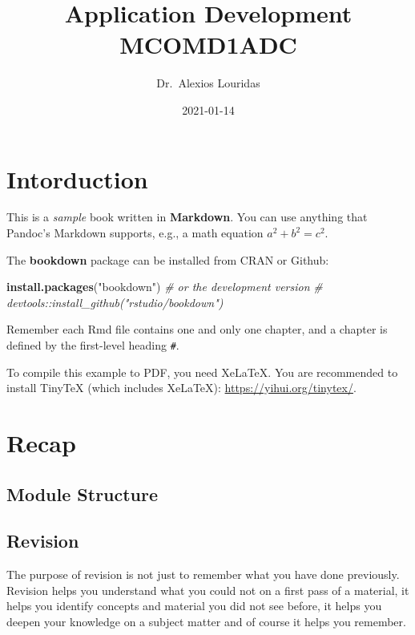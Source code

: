 \documentclass[
]{book}
\title{Application Development MCOMD1ADC}
\author{Dr.~Alexios Louridas}
\date{2021-01-14}
\newenvironment{Shaded}{\begin{snugshade}}{\end{snugshade}}
\newcommand{\CommentTok}[1]{\textcolor[rgb]{0.56,0.35,0.01}{\textit{#1}}}
\newcommand{\KeywordTok}[1]{\textcolor[rgb]{0.13,0.29,0.53}{\textbf{#1}}}
\newcommand{\NormalTok}[1]{#1}
\newcommand{\StringTok}[1]{\textcolor[rgb]{0.31,0.60,0.02}{#1}}
\begin{document}
\maketitle

{
\setcounter{tocdepth}{1}
\tableofcontents
}
\hypertarget{intorduction}{%
\chapter*{Intorduction}\label{intorduction}}

This is a \emph{sample} book written in \textbf{Markdown}. You can use anything that Pandoc's Markdown supports, e.g., a math equation \(a^2 + b^2 = c^2\).

The \textbf{bookdown} package can be installed from CRAN or Github:

\begin{Shaded}
\begin{Highlighting}[]
\KeywordTok{install.packages}\NormalTok{(}\StringTok{"bookdown"}\NormalTok{)}
\CommentTok{# or the development version}
\CommentTok{# devtools::install_github("rstudio/bookdown")}
\end{Highlighting}
\end{Shaded}

Remember each Rmd file contains one and only one chapter, and a chapter is defined by the first-level heading \texttt{\#}.

To compile this example to PDF, you need XeLaTeX. You are recommended to install TinyTeX (which includes XeLaTeX): \url{https://yihui.org/tinytex/}.

\hypertarget{recap}{%
\chapter{Recap}\label{recap}}

\hypertarget{module-structure}{%
\section{Module Structure}\label{module-structure}}

\hypertarget{revision}{%
\section{Revision}\label{revision}}

The purpose of revision is not just to remember what you have done previously. Revision helps you understand what you could not on a first pass of a material, it helps you identify concepts and material you did not see before, it helps you deepen your knowledge on a subject matter and of course it helps you remember.
\end{document}
